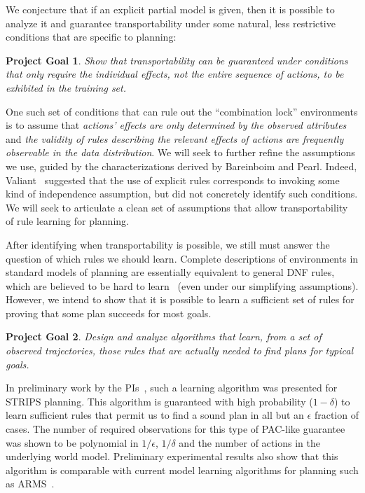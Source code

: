 \documentclass[12pt]{article}
\newtheorem{problem}{Project Goal}
\begin{document}
We conjecture that if an explicit partial model is given, then it is possible to analyze it and guarantee transportability under some natural, less restrictive conditions that are specific to planning:
\begin{problem}
Show that transportability can be guaranteed under conditions that only require the individual effects, not the entire sequence of actions, to be exhibited in the training set. 
\end{problem}
One such set of conditions that can rule out the ``combination lock'' environments is to assume that {\em actions' effects are only determined by the observed attributes} and {\em the validity of rules describing the relevant effects of actions are frequently observable in the data distribution}. We will seek to further refine the assumptions we use, guided by the characterizations derived by Bareinboim and Pearl. Indeed, Valiant~\cite{valiant2006knowledgeInfusion} suggested that the use of explicit rules corresponds to invoking some kind of independence assumption, but did not concretely identify such conditions. We will seek to articulate a clean set of assumptions that allow transportability of rule learning for planning.




After identifying when transportability is possible, we still must answer the question of which rules we should  learn. Complete descriptions of environments in standard models of planning are essentially equivalent to general DNF rules, which are believed to be hard to learn~\cite{daniely2016dnf} (even under our simplifying assumptions). However, we intend to show that it is possible to learn a sufficient set of rules for proving that some plan succeeds for most goals.
\begin{problem}
Design and analyze algorithms that learn, from a set of observed trajectories, those rules that are actually needed to find plans for typical goals.
\end{problem}

In preliminary work by the PIs~\cite{stern2017efficientAndSafe}, such a learning algorithm was presented for STRIPS planning. This algorithm is guaranteed with high probability ($1-\delta$)  to learn sufficient rules that permit us to find a sound plan in all but an $\epsilon$ fraction of cases. The number of required observations for this type of PAC-like guarantee was shown to be polynomial in $1/\epsilon$, $1/\delta$ and the number of actions in the underlying world model. Preliminary experimental results also show that this algorithm is comparable with current model learning algorithms for planning such as ARMS~\cite{yang2007learning}. 
\end{document}
